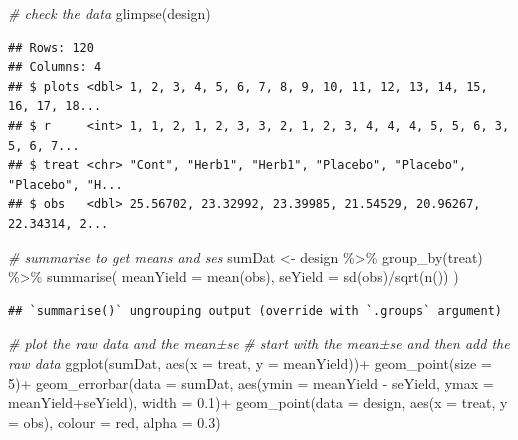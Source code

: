\documentclass[
]{book}
\newenvironment{Shaded}{\begin{snugshade}}{\end{snugshade}}
\newcommand{\AttributeTok}[1]{\textcolor[rgb]{0.77,0.63,0.00}{#1}}
\newcommand{\CommentTok}[1]{\textcolor[rgb]{0.56,0.35,0.01}{\textit{#1}}}
\newcommand{\DecValTok}[1]{\textcolor[rgb]{0.00,0.00,0.81}{#1}}
\newcommand{\FloatTok}[1]{\textcolor[rgb]{0.00,0.00,0.81}{#1}}
\newcommand{\FunctionTok}[1]{\textcolor[rgb]{0.00,0.00,0.00}{#1}}
\newcommand{\NormalTok}[1]{#1}
\newcommand{\OtherTok}[1]{\textcolor[rgb]{0.56,0.35,0.01}{#1}}
\newcommand{\SpecialCharTok}[1]{\textcolor[rgb]{0.00,0.00,0.00}{#1}}
\newcommand{\StringTok}[1]{\textcolor[rgb]{0.31,0.60,0.02}{#1}}
\begin{document}
\begin{Shaded}
\begin{Highlighting}[]
\CommentTok{\# check the data}
\FunctionTok{glimpse}\NormalTok{(design)}
\end{Highlighting}
\end{Shaded}

\begin{verbatim}
## Rows: 120
## Columns: 4
## $ plots <dbl> 1, 2, 3, 4, 5, 6, 7, 8, 9, 10, 11, 12, 13, 14, 15, 16, 17, 18...
## $ r     <int> 1, 1, 2, 1, 2, 3, 3, 2, 1, 2, 3, 4, 4, 4, 5, 5, 6, 3, 5, 6, 7...
## $ treat <chr> "Cont", "Herb1", "Herb1", "Placebo", "Placebo", "Placebo", "H...
## $ obs   <dbl> 25.56702, 23.32992, 23.39985, 21.54529, 20.96267, 22.34314, 2...
\end{verbatim}

\begin{Shaded}
\begin{Highlighting}[]
\CommentTok{\# summarise to get means and ses}
\NormalTok{sumDat }\OtherTok{\textless{}{-}}\NormalTok{ design }\SpecialCharTok{\%\textgreater{}\%} 
  \FunctionTok{group\_by}\NormalTok{(treat) }\SpecialCharTok{\%\textgreater{}\%} 
  \FunctionTok{summarise}\NormalTok{(}
    \AttributeTok{meanYield =} \FunctionTok{mean}\NormalTok{(obs),}
    \AttributeTok{seYield =} \FunctionTok{sd}\NormalTok{(obs)}\SpecialCharTok{/}\FunctionTok{sqrt}\NormalTok{(}\FunctionTok{n}\NormalTok{())}
\NormalTok{  )}
\end{Highlighting}
\end{Shaded}

\begin{verbatim}
## `summarise()` ungrouping output (override with `.groups` argument)
\end{verbatim}

\begin{Shaded}
\begin{Highlighting}[]
\CommentTok{\# plot the raw data and the mean±se}
\CommentTok{\# start with the mean±se and then add the raw data}
\FunctionTok{ggplot}\NormalTok{(sumDat, }\FunctionTok{aes}\NormalTok{(}\AttributeTok{x =}\NormalTok{ treat, }\AttributeTok{y =}\NormalTok{ meanYield))}\SpecialCharTok{+}
  \FunctionTok{geom\_point}\NormalTok{(}\AttributeTok{size =} \DecValTok{5}\NormalTok{)}\SpecialCharTok{+}
  \FunctionTok{geom\_errorbar}\NormalTok{(}\AttributeTok{data =}\NormalTok{ sumDat, }\FunctionTok{aes}\NormalTok{(}\AttributeTok{ymin =}\NormalTok{ meanYield }\SpecialCharTok{{-}}\NormalTok{ seYield, }\AttributeTok{ymax =}\NormalTok{ meanYield}\SpecialCharTok{+}\NormalTok{seYield),}
                \AttributeTok{width =} \FloatTok{0.1}\NormalTok{)}\SpecialCharTok{+}
  \FunctionTok{geom\_point}\NormalTok{(}\AttributeTok{data =}\NormalTok{ design, }\FunctionTok{aes}\NormalTok{(}\AttributeTok{x =}\NormalTok{ treat, }\AttributeTok{y =}\NormalTok{ obs), }\AttributeTok{colour =} \StringTok{\textquotesingle{}red\textquotesingle{}}\NormalTok{, }\AttributeTok{alpha =} \FloatTok{0.3}\NormalTok{)}
\end{Highlighting}
\end{Shaded}
\end{document}
